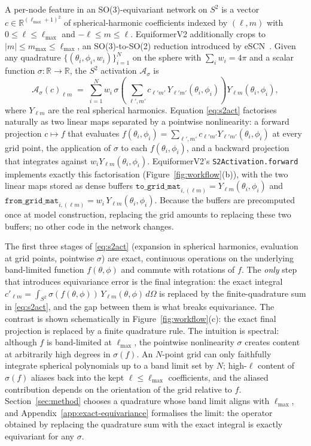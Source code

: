 \documentclass{article}
\begin{document}
A per-node feature in an SO(3)-equivariant network on $S^2$ is a
vector $c \in \mathbb{R}^{(\ell_{\max}+1)^2}$ of spherical-harmonic
coefficients indexed by $(\ell, m)$ with $0 \leq \ell \leq \ell_{\max}$
and $-\ell \leq m \leq \ell$. EquiformerV2 additionally crops to
$|m| \leq m_{\max} \leq \ell_{\max}$, an SO(3)-to-SO(2) reduction
introduced by eSCN~\cite{escn}. Given any quadrature
$\{(\theta_i, \phi_i, w_i)\}_{i=1}^N$ on the sphere with
$\sum_i w_i = 4\pi$ and a scalar function
$\sigma : \mathbb{R} \to \mathbb{R}$, the $S^2$ activation
$\mathcal{A}_\sigma$ is
\begin{equation}
  \mathcal{A}_\sigma(c)_{\ell m}
  \;=\;
  \sum_{i=1}^{N} w_i \,
  \sigma\!\left(\,\sum_{\ell',m'} c_{\ell' m'}\,
        Y_{\ell' m'}(\theta_i, \phi_i)\right)
  Y_{\ell m}(\theta_i, \phi_i),
  \label{eq:s2act}
\end{equation}
where $Y_{\ell m}$ are the real spherical harmonics. Equation
\eqref{eq:s2act} factorises naturally as two linear maps separated by
a pointwise nonlinearity: a forward projection $c \mapsto f$ that
evaluates $f(\theta_i, \phi_i) = \sum_{\ell', m'} c_{\ell' m'}
Y_{\ell' m'}(\theta_i, \phi_i)$ at every grid point, the application
of $\sigma$ to each $f(\theta_i, \phi_i)$, and a backward
projection that integrates against $w_i Y_{\ell m}(\theta_i, \phi_i)$.
EquiformerV2's \texttt{S2Activation.forward} implements exactly this
factorisation (Figure~\ref{fig:workflow}(b)),
with the two linear maps stored as dense buffers
$\texttt{to\_grid\_mat}_{i, (\ell m)} = Y_{\ell m}(\theta_i, \phi_i)$
and
$\texttt{from\_grid\_mat}_{i, (\ell m)} = w_i \,
Y_{\ell m}(\theta_i, \phi_i)$. Because the buffers are precomputed
once at model construction, replacing the grid amounts to replacing
these two buffers; no other code in the network changes.

The first three stages of \eqref{eq:s2act} (expansion in spherical
harmonics, evaluation at grid points, pointwise $\sigma$) are exact,
continuous operations on the underlying band-limited function
$f(\theta, \phi)$ and commute with rotations of $f$. The
\emph{only} step that introduces equivariance error is the final
integration: the exact integral
$c'_{\ell m} = \int_{S^2} \sigma(f(\theta,\phi))\,Y_{\ell m}(\theta,
\phi)\,d\Omega$ is replaced by the finite-quadrature sum in
\eqref{eq:s2act}, and the gap between them is what breaks
equivariance. The contrast is shown schematically in
Figure~\ref{fig:workflow}(c): the exact final projection is replaced
by a finite quadrature rule. The intuition is spectral: although $f$
is band-limited at $\ell_{\max}$, the pointwise nonlinearity $\sigma$
creates content at arbitrarily high degrees in $\sigma(f)$. An
$N$-point grid can only faithfully integrate spherical polynomials up
to a band limit set by $N$; high-$\ell$ content of $\sigma(f)$
aliases back into the kept $\ell \leq \ell_{\max}$ coefficients, and
the aliased contribution depends on the orientation of the grid
relative to $f$. Section~\ref{sec:method} chooses a quadrature whose
band limit aligns with $\ell_{\max}$, and
Appendix~\ref{app:exact-equivariance} formalises the limit:
the operator obtained by replacing the quadrature sum with the exact
integral is exactly equivariant for any $\sigma$.
\end{document}
